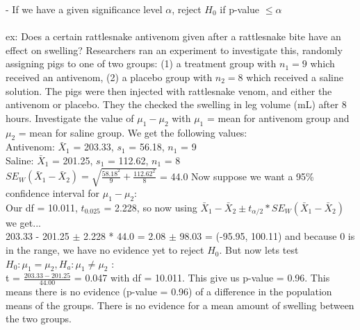 \documentclass[12pt, a4paper]{article}
\begin{document}
	- If we have a given significance level $\alpha$, reject $H_0$ if p-value $\leq \alpha$ \\~\\
	ex: Does a certain rattlesnake antivenom given after a rattlesnake bite have an effect on swelling? Researchers ran an experiment to investigate this, randomly assigning pigs to one of two groups: (1) a treatment group with $n_1 = 9$ which received an antivenom, (2) a placebo group with $n_2 = 8$ which received a saline solution. The pigs were then injected with rattlesnake venom, and either the antivenom or placebo. They the checked the swelling in leg volume (mL) after 8 hours. Investigate the value of $\mu_1 - \mu_2$ with $\mu_1$ = mean for antivenom group and $\mu_2$ = mean for saline group. We get the following values: \\
	Antivenom: $\bar{X}_1$ = 203.33, $s_1$ = 56.18, $n_1$ = 9 \\
	Saline: $\bar{X}_1$ = 201.25, $s_1$ = 112.62, $n_1$ = 8 \\
	$SE_W(\bar{X}_1 - \bar{X}_2) = \sqrt{\frac{58.18^2}{9}+\frac{112.62^2}{8}}$ = 44.0
	Now suppose we want a 95\% confidence interval for $\mu_1 - \mu_2$: \\
	Our df = 10.011, $t_{0.025}$ = 2.228, so now using $\bar{X}_1 - \bar{X}_2 \pm t_{\alpha/2} * SE_W(\bar{X}_1 - \bar{X}_2)$ we get... \\ 203.33 - 201.25 $\pm$ 2.228 * 44.0 = 2.08 $\pm$ 98.03 = (-95.95, 100.11) and because 0 is in the range, we have no evidence yet to reject $H_0$. But now lets test $H_0: \mu_1 = \mu_2, H_a: \mu_1 \neq \mu_2$ : \\
	t = $\frac{203.33 - 201.25}{44.00}$ = 0.047 with df = 10.011. This give us p-value = 0.96. This means there is no evidence (p-value = 0.96) of a difference in the population means of the groups. There is no evidence for a mean amount of swelling between the two groups. \newpage
	
\end{document}
